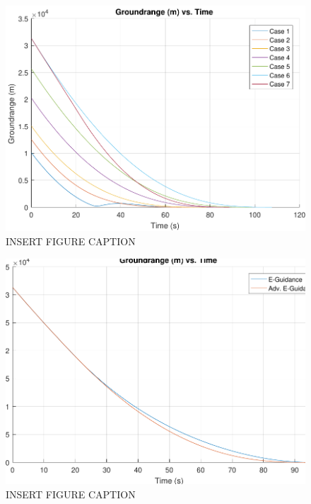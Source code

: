 \begin{figure}[H]
	\centering
	\begin{minipage}{4.5 in}
		\includegraphics[width=\linewidth]{Figures/rngpowvac.pdf}
		\caption{INSERT FIGURE CAPTION \label{fig:rngpowvac} }
	\end{minipage}
\end{figure}



\begin{figure}[H]
	\centering
	\begin{minipage}{4.5 in}
		\includegraphics[width=\linewidth]{Figures/rngsimvsadv.pdf}
		\caption{INSERT FIGURE CAPTION \label{fig:rngsimvsadv} }
	\end{minipage}
\end{figure}



